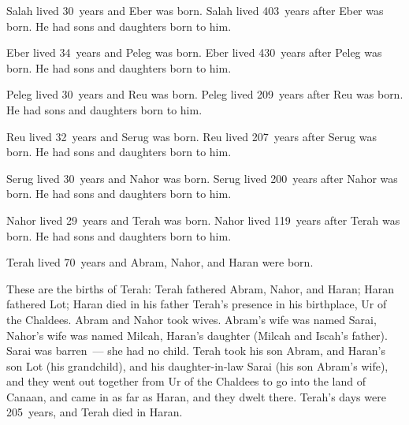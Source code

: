 \begin{inparaenum}
   Salah lived 30~years and Eber was born.%
   Salah lived 403~years after Eber was born. He had sons and daughters born to him.%
  
   Eber lived 34~years and Peleg was born.%
   Eber lived 430~years after Peleg was born. He had sons and daughters born to him.%
  
   Peleg lived 30~years and Reu was born.%
   Peleg lived 209~years after Reu was born. He had sons and daughters born to him.%
  
   Reu lived 32~years and Serug was born.%
   Reu lived 207~years after Serug was born. He had sons and daughters born to him.%
  
   Serug lived 30~years and Nahor was born.%
   Serug lived 200~years after Nahor was born. He had sons and daughters born to him.%
  
   Nahor lived 29~years and Terah was born.%
   Nahor lived 119~years after Terah was born. He had sons and daughters born to him.%
  
   Terah lived 70~years and Abram, Nahor, and Haran were born.%
  
   These are the births of Terah: Terah fathered Abram, Nahor, and Haran; Haran fathered Lot;%
   Haran died in his father Terah's presence in his birthplace, Ur of the Chaldees.%
   Abram and Nahor took wives. Abram's wife was named Sarai, Nahor's wife was named Milcah, Haran's daughter (Milcah and Iscah's father).%
   Sarai was barren~--- she had no child.%
   Terah took his son Abram, and Haran's son Lot (his grandchild), and his daughter-in-law Sarai (his son Abram's wife), and they went out together from Ur of the Chaldees to go into the land of Canaan, and came in as far as Haran, and they dwelt there.%
   Terah's days were 205~years, and Terah died in Haran.%
\end{inparaenum}
